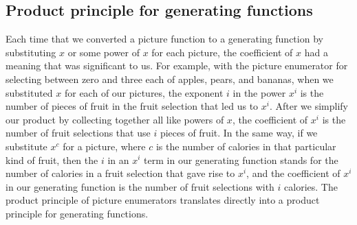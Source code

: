 \documentclass[10pt,]{book}
\theoremstyle{plain}
\theoremstyle{definition}
\theoremstyle{definition}
\numberwithin{equation}{chapter}
\begin{document}
\subsection[{Product principle for generating functions}]{Product principle for generating functions}\label{subsection-37}
Each time that we converted a picture function to a generating function by substituting \(x\) or some power of \(x\) for each picture, the coefficient of \(x\) had a meaning that was significant to us. For example, with the picture enumerator for selecting between zero and three each of apples, pears, and bananas, when we substituted \(x\) for each of our pictures, the exponent \(i\) in the power \(x^i\) is the number of pieces of fruit in the fruit selection that led us to \(x^i\). After we simplify our product by collecting together all like powers of \(x\), the coefficient of \(x^i\) is the number of fruit selections that use \(i\) pieces of fruit. In the same way, if we substitute \(x^c\) for a picture, where \(c\) is the number of calories in that particular kind of fruit, then the \(i\) in an \(x^i\) term in our generating function stands for the number of calories in a fruit selection that gave rise to \(x^i\), and the coefficient of \(x^i\) in our generating function is the number of fruit selections with \(i\) calories.  The product principle of picture enumerators translates directly into a product principle for generating functions.%
\end{document}
